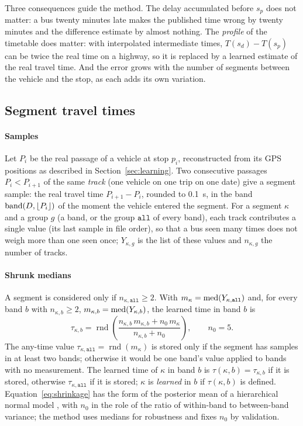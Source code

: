 \noindent Three consequences guide the method. The delay accumulated before $s_p$ does not matter: a bus twenty
minutes late makes the published time wrong by twenty minutes and the difference estimate by almost nothing. The
\emph{profile} of the timetable does matter: with interpolated intermediate times, $T(s_d)-T(s_p)$ can be twice the
real time on a highway, so it is replaced by a learned estimate of the real travel time. And the error grows with the
number of segments between the vehicle and the stop, as each adds its own variation.

\subsection{Segment travel times}
\label{sec:segments}

\paragraph{Samples} Let $P_i$ be the real passage of a vehicle at stop $p_i$, reconstructed from its GPS positions as
described in Section~\ref{sec:learning}. Two consecutive passages $P_i<P_{i+1}$ of the same \emph{track} (one vehicle
on one trip on one date) give a segment sample: the real travel time $P_{i+1}-P_i$, rounded to 0.1~s, in the band
$\operatorname{band}(D,\lfloor P_i\rfloor)$ of the moment the vehicle entered the segment. For a segment $\kappa$ and a group $g$ (a
band, or the group $\mathtt{all}$ of every band), each track contributes a single value (its last sample in file
order), so that a bus seen many times does not weigh more than one seen once; $Y_{\kappa,g}$ is the list of these
values and $n_{\kappa,g}$ the number of tracks.

\paragraph{Shrunk medians} A segment is considered only if $n_{\kappa,\mathtt{all}}\ge2$. With
$m_\kappa=\operatorname{med}(Y_{\kappa,\mathtt{all}})$ and, for every band $b$ with $n_{\kappa,b}\ge2$,
$m_{\kappa,b}=\operatorname{med}(Y_{\kappa,b})$, the learned time in band $b$ is
\begin{equation}
\tau_{\kappa,b}=\operatorname{rnd}\!\left(\frac{n_{\kappa,b}\,m_{\kappa,b}+n_0\,m_\kappa}{n_{\kappa,b}+n_0}\right),\qquad n_0=5.
\label{eq:shrinkage}
\end{equation}
The any-time value $\tau_{\kappa,\mathtt{all}}=\operatorname{rnd}(m_\kappa)$ is stored only if the segment has samples
in at least two bands; otherwise it would be one band's value applied to bands with no measurement. The learned time
of $\kappa$ in band $b$ is $\tau(\kappa,b)=\tau_{\kappa,b}$ if it is stored, otherwise $\tau_{\kappa,\mathtt{all}}$
if it is stored; $\kappa$ is \emph{learned} in $b$ if $\tau(\kappa,b)$ is defined. Equation~\eqref{eq:shrinkage} has
the form of the posterior mean of a hierarchical normal model \parencite{gelman2013,efronmorris1975}, with $n_0$ in
the role of the ratio of within-band to between-band variance; the method uses medians for robustness
\parencite{huber1964} and fixes $n_0$ by validation.

